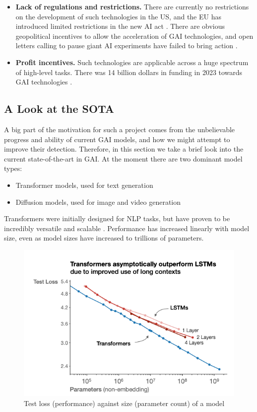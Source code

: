 \documentclass[12pt,a4paper]{article}
\begin{document}
\begin{itemize}
    \item \textbf{Lack of regulations and restrictions.} There are currently no restrictions on the development of such technologies in the US, and the EU has introduced limited restrictions in the new AI act \cite{aiact}. There are obvious geopolitical incentives to allow the acceleration of GAI technologies, and open letters calling to pause giant AI experiments have failed to bring action \cite{fol}.
    \item \textbf{Profit incentives.} Such technologies are applicable across a huge spectrum of high-level tasks. There was 14 billion dollars in funding in 2023 towards GAI technologies \cite{genfunding}.
\end{itemize}
\subsection{A Look at the SOTA}
 A big part of the motivation for such a project comes from the unbelievable progress and ability of current GAI models, and how we might attempt to improve their detection. Therefore, in this section we take a brief look into the current state-of-the-art in GAI. At the moment there are two dominant model types:
\begin{itemize}
    \item Transformer models, used for text generation
    \item Diffusion models, used for image and video generation
\end{itemize}
Transformers were initially designed for NLP tasks, but have proven to be incredibly versatile and scalable \cite{scaling}. Performance has increased linearly with model size, even as model sizes have increased to trillions of parameters. 
\begin{figure}[H]
    \centering
    \includegraphics[scale=1]{linearScaling.png}
    \caption{Test loss (performance) against size (parameter count) of a model}
\end{figure}
\end{document}
